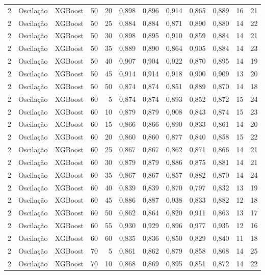 \begin{longtable}{@{}rllrrrrrrrrr@{}}
2 & Oscilação & XGBoost & 50 & 20 & 0,898 & 0,896 & 0,914 & 0,865 & 0,889 & 16 & 21 \\
2 & Oscilação & XGBoost & 50 & 25 & 0,884 & 0,884 & 0,871 & 0,890 & 0,880 & 14 & 22 \\
2 & Oscilação & XGBoost & 50 & 30 & 0,898 & 0,895 & 0,910 & 0,859 & 0,884 & 14 & 21 \\
2 & Oscilação & XGBoost & 50 & 35 & 0,889 & 0,890 & 0,864 & 0,905 & 0,884 & 14 & 23 \\
2 & Oscilação & XGBoost & 50 & 40 & 0,907 & 0,904 & 0,922 & 0,870 & 0,895 & 14 & 19 \\
2 & Oscilação & XGBoost & 50 & 45 & 0,914 & 0,914 & 0,918 & 0,900 & 0,909 & 13 & 20 \\
2 & Oscilação & XGBoost & 50 & 50 & 0,874 & 0,874 & 0,851 & 0,889 & 0,870 & 14 & 18 \\
2 & Oscilação & XGBoost & 60 & 5 & 0,874 & 0,874 & 0,893 & 0,852 & 0,872 & 15 & 24 \\
2 & Oscilação & XGBoost & 60 & 10 & 0,879 & 0,879 & 0,908 & 0,843 & 0,874 & 15 & 23 \\
2 & Oscilação & XGBoost & 60 & 15 & 0,866 & 0,866 & 0,890 & 0,833 & 0,861 & 14 & 20 \\
2 & Oscilação & XGBoost & 60 & 20 & 0,860 & 0,860 & 0,877 & 0,840 & 0,858 & 15 & 22 \\
2 & Oscilação & XGBoost & 60 & 25 & 0,867 & 0,867 & 0,862 & 0,871 & 0,866 & 14 & 21 \\
2 & Oscilação & XGBoost & 60 & 30 & 0,879 & 0,879 & 0,886 & 0,875 & 0,881 & 14 & 21 \\
2 & Oscilação & XGBoost & 60 & 35 & 0,867 & 0,867 & 0,857 & 0,882 & 0,870 & 14 & 24 \\
2 & Oscilação & XGBoost & 60 & 40 & 0,839 & 0,839 & 0,870 & 0,797 & 0,832 & 13 & 19 \\
2 & Oscilação & XGBoost & 60 & 45 & 0,886 & 0,887 & 0,938 & 0,833 & 0,882 & 12 & 18 \\
2 & Oscilação & XGBoost & 60 & 50 & 0,862 & 0,864 & 0,820 & 0,911 & 0,863 & 13 & 17 \\
2 & Oscilação & XGBoost & 60 & 55 & 0,930 & 0,929 & 0,896 & 0,977 & 0,935 & 12 & 16 \\
2 & Oscilação & XGBoost & 60 & 60 & 0,835 & 0,836 & 0,850 & 0,829 & 0,840 & 11 & 18 \\
2 & Oscilação & XGBoost & 70 & 5 & 0,861 & 0,862 & 0,879 & 0,858 & 0,868 & 14 & 25 \\
2 & Oscilação & XGBoost & 70 & 10 & 0,868 & 0,869 & 0,895 & 0,851 & 0,872 & 14 & 22 \\

\end{longtable}
